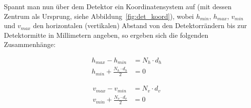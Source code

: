 Spannt man nun über dem Detektor ein Koordinatensystem auf (mit dessen Zentrum als Ursprung, siehe
Abbildung~\ref{fig:det_koord}), wobei $h_{min}$, $h_{max}$, $v_{min}$ und $v_{max}$ den horizontalen (vertikalen)
Abstand von den Detektorrändern bis zur Detektormitte in Millimetern angeben, so ergeben sich die folgenden
Zusammenhänge:

\begin{equation}\label{eq:det_h}
    \begin{aligned}
        h_{max} - h_{min} &= N_h \cdot d_h\\
        h_{min} + \frac{N_h \cdot d_h}{2} &= 0
    \end{aligned}
\end{equation}

\begin{equation}\label{eq:det_v}
    \begin{aligned}
        v_{max} - v_{min} &= N_v \cdot d_v\\
        v_{min} + \frac{N_v \cdot d_v}{2} &= 0
    \end{aligned}
\end{equation}

